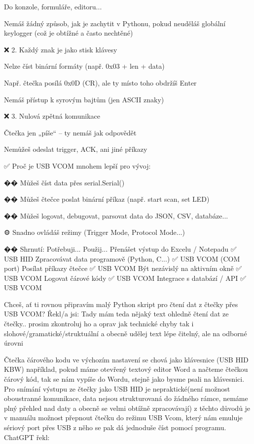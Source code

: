     Do konzole, formuláře, editoru...

    Nemáš žádný způsob, jak je zachytit v Pythonu, pokud neuděláš globální keylogger (což je obtížné a často nechtěné)

❌ 2. Každý znak je jako stisk klávesy

    Nelze číst binární formáty (např. 0x03 + len + data)

    Např. čtečka posílá 0x0D (CR), ale ty místo toho obdržíš Enter

    Nemáš přístup k syrovým bajtům (jen ASCII znaky)

❌ 3. Nulová zpětná komunikace

    Čtečka jen „píše“ – ty nemáš jak odpovědět

    Nemůžeš odeslat trigger, ACK, ani jiné příkazy

✅ Proč je USB VCOM mnohem lepší pro vývoj:

    �� Můžeš číst data přes serial.Serial()

    �� Můžeš čtečce poslat binární příkaz (např. start scan, set LED)

    �� Můžeš logovat, debugovat, parsovat data do JSON, CSV, databáze...

    ⚙️ Snadno ovládáš režimy (Trigger Mode, Protocol Mode...)

�� Shrnutí:
Potřebuji...	Použij...
Přenášet výstup do Excelu / Notepadu	✅ USB HID
Zpracovávat data programově (Python, C...)	✅ USB VCOM (COM port)
Posílat příkazy čtečce	✅ USB VCOM
Být nezávislý na aktivním okně	✅ USB VCOM
Logovat čárové kódy	✅ USB VCOM
Integrace s databází / API	✅ USB VCOM

Chceš, ať ti rovnou připravím malý Python skript pro čtení dat z čtečky přes USB VCOM?
Řekl/a jsi:
Tady mám teda nějaký text ohledně čtení dat ze čtečky.. prosim zkontroluj ho a oprav jak technické chyby tak i slohové/gramatické/struktuální a obecně udělej text lépe čitelný, ale na odborné úrovni

Čtečka čárového kodu ve výchozím nastavení se chová jako klávesnice (USB HID KBW) například, pokud máme otevřený textový editor Word a načteme čtečkou čárový kód, tak se nám vypíše do Wordu, stejně jako bysme psali na klávesnici. Pro snímání výstupu ze čtečky jako USB HID je nepraktické(není možnost oboustranné komunikace, data nejsou strukturovaná do žádného rámce, nemáme plný přehled nad daty a obecně se velmi obtížně zpracovávají) z těchto důvodů je v manuálu možnost přepnout čtečku do režimu USB Vcom, který nám emuluje sériový port přes USB z něho se pak dá jednoduše číst pomocí programu.
ChatGPT řekl:


